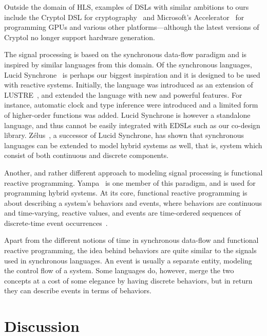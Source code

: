 \documentclass[../paper.tex]{subfiles}
\begin{document}
Outside the domain of HLS, examples of DSLs with similar ambitions to ours include the Cryptol DSL for cryptography~\cite{cryptol} and Microsoft's Accelerator~\cite{accelerator} for programming GPUs and various other platforms---although the latest versions of Cryptol no longer support hardware generation.

The signal processing is based on the synchronous data-flow paradigm and is inspired by similar languages from this domain. Of the synchronous languages, Lucid Synchrone~\cite{pouzet2006, colaco2004} is perhaps our biggest inspiration and it is designed to be used with reactive systems. Initially, the language was introduced as an extension of LUSTRE~\cite{hu1998}, and extended the language with new and powerful features. For instance, automatic clock and type inference were introduced and a limited form of higher-order functions was added. Lucid Synchrone is however a standalone language, and thus cannot be easily integrated with EDSLs such as our co-design library. Z{\'e}lus~\cite{zelus2013}, a successor of Lucid Synchrone, has shown that synchronous languages can be extended to model hybrid systems as well, that is, system which consist of both continuous and discrete components.

Another, and rather different approach to modeling signal processing is functional reactive programming. Yampa~\cite{yampa2003} is one member of this paradigm, and is used for programming hybrid systems. At its core, functional reactive programming is about describing a system's behaviors and events, where behaviors are continuous and time-varying, reactive values, and events are time-ordered sequences of discrete-time event occurrences~\cite{nilsson2002}. 

Apart from the different notions of time in synchronous data-flow and functional reactive programming, the idea behind behaviors are quite similar to the signals used in synchronous languages. An event is usually a separate entity, modeling the control flow of a system. Some languages do, however, merge the two concepts at a cost of some elegance by having discrete behaviors, but in return they can describe events in terms of behaviors.

\section{Discussion}
\label{disc}
\end{document}
